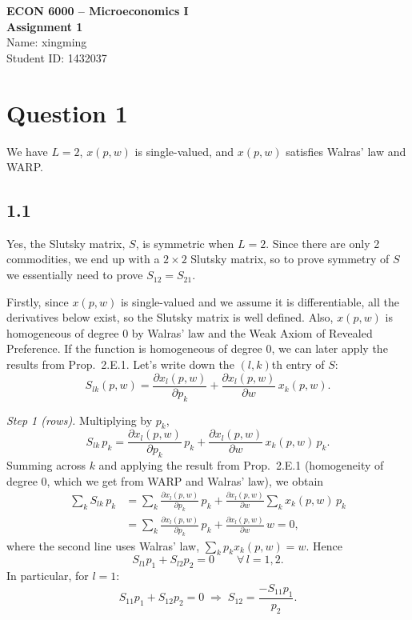\documentclass[12pt,letterpaper]{article}
\begin{document}
\begin{center}
  {\large\bfseries ECON 6000 -- Microeconomics I}\\[4pt]
  {\large\bfseries Assignment 1}\\[10pt]
  Name: xingming\\
  Student ID: 1432037
\end{center}

\vspace{6pt}

\section*{Question 1}

We have $L=2$, $x(p,w)$ is single-valued, and $x(p,w)$ satisfies Walras' law and WARP.

\subsection*{1.1}

Yes, the Slutsky matrix, $S$, is symmetric when $L=2$. Since there are only 2 commodities, we end up with a $2\times 2$ Slutsky matrix, so to prove symmetry of $S$ we essentially need to prove $S_{12}= S_{21}$.

Firstly, since $x(p,w)$ is single-valued and we assume it is differentiable, all the derivatives below exist, so the Slutsky matrix is well defined. Also, $x(p,w)$ is homogeneous of degree 0 by Walras' law and the Weak Axiom of Revealed Preference. If the function is homogeneous of degree 0, we can later apply the results from Prop.~2.E.1. Let's write down the $(l,k)$th entry of $S$:
\[
S_{lk}(p,w)
= \frac{\partial x_l(p,w)}{\partial p_k}
+ \frac{\partial x_l(p,w)}{\partial w}\, x_k(p,w).
\]

\textit{Step 1 (rows).} Multiplying by $p_k$,
\[
S_{lk}\,p_k
= \frac{\partial x_l(p,w)}{\partial p_k}\,p_k
+ \frac{\partial x_l(p,w)}{\partial w}\, x_k(p,w)\,p_k .
\]
Summing across $k$ and applying the result from Prop.~2.E.1 (homogeneity of degree 0, which we get from WARP and Walras' law), we obtain
\begin{align*}
\sum_k S_{lk}\,p_k
&= \sum_k \frac{\partial x_l(p,w)}{\partial p_k}\,p_k
 + \frac{\partial x_l(p,w)}{\partial w}\sum_k x_k(p,w)\,p_k \\
&= \sum_k \frac{\partial x_l(p,w)}{\partial p_k}\,p_k
 + \frac{\partial x_l(p,w)}{\partial w}\,w = 0,
\end{align*}
where the second line uses Walras' law, $\sum_k p_k x_k(p,w) = w$. Hence
\[
S_{l1}p_1 + S_{l2}p_2 = 0 \qquad \forall\, l=1,2 .
\]
In particular, for $l=1$:
\[
S_{11}p_1 + S_{12}p_2 = 0 \;\Longrightarrow\; S_{12} = \frac{-S_{11}p_1}{p_2}.
\]
\end{document}

